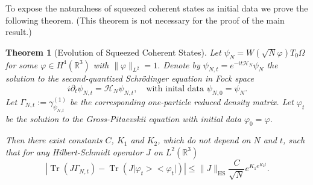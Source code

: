 \documentclass[11pt,a4paper,DIV11]{scrartcl}	%
\newtheorem{thm}{Theorem}[section]
\newcommand{\Hcal}{\mathcal{H}}		%
\newcommand{\Rbb}{\mathbb{R}}		%
\newcommand{\norm}[1]{\lVert#1\rVert}	%
\newcommand{\project}[1]{\lvert #1 \big>\big< #1\rvert}	%
\newcommand{\Tr}{\operatorname{Tr}}	%
\newcommand{\HS}{_{\textrm{HS}}}
\newcommand{\bd}{\begin{displaymath}}			%
\newcommand{\ed}{\end{displaymath}}
\begin{document}
To expose the naturalness of squeezed coherent states as initial data we prove the following theorem. (This theorem is not necessary for the proof of the main result.)
\begin{thm}[Evolution of Squeezed Coherent States] \label{thm:main_squeezed}
 Let $\psi_{N} = W(\sqrt{N} \varphi) T_0 \Omega$ for some $\varphi \in H^4(\Rbb^3)$ with $\norm{\varphi}_{L^2} = 1$. Denote by $\psi_{N,t} = e^{-it \Hcal_N}\psi_N$ the solution to the second-quantized Schr\"odinger equation in Fock space
\[i \partial_t \psi_{N,t} = \Hcal_N \psi_{N,t},\quad \mbox{with inital data } \psi_{N,0} = \psi_N.\]
Let $\Gamma_{N,t} := \gamma_{\psi_{N,t}}^{(1)}$ be the corresponding one-particle reduced density matrix.
Let $\varphi_t$ be the solution to the Gross-Pitaevskii equation with initial data $\varphi_0 = \varphi$.

 Then there exist constants $C$, $K_1$ and $K_2$, which do not depend on $N$ and $t$, such that for any Hilbert-Schmidt operator $J$ on $L^2(\Rbb^3)$
\bd
\left\lvert \Tr\left(J \Gamma_{N,t} \right) - \Tr\left( J \project{\varphi_t}  \right) \right\rvert \leq \norm{J}\HS \frac{C}{\sqrt{N}}e^{K_1 e^{K_2 t}}.
\ed
\end{thm}
\end{document}
